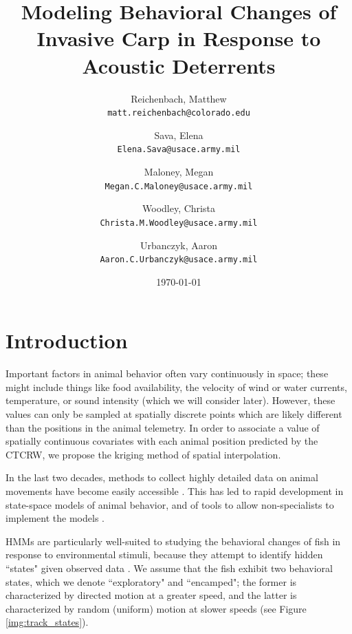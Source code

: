 \documentclass[12pt]{article}
\begin{document}
	\title{Modeling Behavioral Changes of Invasive Carp in Response to Acoustic Deterrents}
	\author{
		Reichenbach, Matthew \\
		\texttt{matt.reichenbach@colorado.edu}
		\and
		Sava, Elena \\
		\texttt{Elena.Sava@usace.army.mil}
		\and
		Maloney, Megan \\
		\texttt{Megan.C.Maloney@usace.army.mil}
		\and
		Woodley, Christa \\
		\texttt{Christa.M.Woodley@usace.army.mil}
		\and
		Urbanczyk, Aaron \\
		\texttt{Aaron.C.Urbanczyk@usace.army.mil}
	}
	\date{\today}
	
	\maketitle
	
	\section{Introduction}
	
	Important factors in animal behavior often vary continuously in space; these might include things like food availability, the velocity of wind or water currents, temperature, or sound intensity (which we will consider later). However, these values can only be sampled at spatially discrete points which are likely different than the positions in the animal telemetry. In order to associate a value of spatially continuous covariates with each animal position predicted by the CTCRW, we propose the kriging method of spatial interpolation.
	
	In the last two decades, methods to collect highly detailed data on animal movements have become easily accessible \cite{McConnell2010, Tomkiewicz2010}. This has led to rapid development in state-space models of animal behavior, and of tools to allow non-specialists to implement the models \cite{Johnson2008, McClintock2012, Michelot2016, Whoriskey2017, McClintock2018}.
	
	HMMs are particularly well-suited to studying the behavioral changes of fish in response to environmental stimuli, because they attempt to identify hidden ``states" given observed data \cite{Rabiner1989}. We assume that the fish exhibit two behavioral states, which we denote ``exploratory" and ``encamped"; the former is characterized by directed motion at a greater speed, and the latter is characterized by random (uniform) motion at slower speeds (see Figure \ref{img:track_states}).
	
\end{document}

